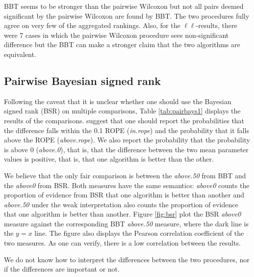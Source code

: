 \documentclass[twoside,11pt,preprint]{article}
\begin{document}
BBT seems to be stronger than the pairwise Wilcoxon but not all pairs
deemed significant by the pairwise Wilcoxon are found by BBT. The two
procedures fully agree on very few of the aggregated rankings. Also,
for the $\ell\ell$-results, there were 7 cases in which the pairwise Wilcoxon
procedure sees non-significant difference but the BBT can make a
stronger claim that the two algorithms are equivalent.

\hypertarget{pairwise-bayesian-signed-rank}{%
\subsection{\texorpdfstring{Pairwise Bayesian signed rank \label{sec:comp-bsr}}{Pairwise Bayesian signed rank }}\label{pairwise-bayesian-signed-rank}}

Following the caveat that it is unclear whether one should use the
Bayesian signed rank (BSR) on multiple comparisons, Table
\ref{tab:pairbays1} displays the results of the
comparisons. \citet{benavoli2017time} suggest that one should report the
probabilities that the difference falls within the 0.1 ROPE
({\em in.rope}) and the probability that it falls above the ROPE
({\em above.rope}). We also report the probability that the
probability is above 0 ({\em above.0}), that is, that the difference
between the two mean parameter values is positive, that is, that one
algorithm is better than the other.

We believe that the only fair comparison is between the
{\em above.50} from BBT and the {\em above0} from BSR. Both measures
have the same semantics: {\em above0} counts the proportion of
evidence from BSR that one algorithm is better
than another and {\em above.50} under the weak interpretation also
counts the proportion of evidence that one algorithm is better than
another. Figure \ref{fig:bsr} plot the BSR {\em above0} measure against the
corresponding BBT {\em above.50} measure, where the dark line is the
\(y=x\) line. The figure also displays the Pearson correlation
coefficient of the two measures. As one can verify, there is a low
correlation between the results.

We do not know how to interpret the differences between the two
procedures, nor if the differences are important or not.
\end{document}
